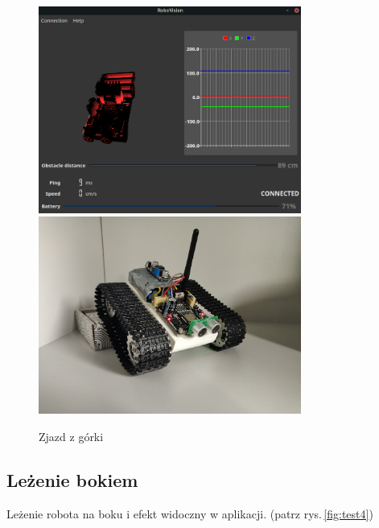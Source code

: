 \documentclass[12pt,a4paper,polish]{article}
\begin{document}
  \begin{figure}[h]
    \centering
    \includegraphics[width=0.77\textwidth]{img/final/3.png}
    \includegraphics[width=0.77\textwidth]{img/final/3e.jpg}
    \caption{Zjazd z górki}
    \label{fig:test3}
  \end{figure}


  \subsection{Leżenie bokiem}
  Leżenie robota na boku i efekt widoczny w aplikacji.
  (patrz rys.\,\ref{fig:test4})
\end{document}
